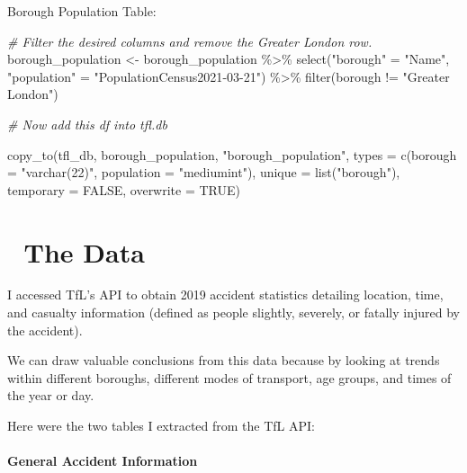 \documentclass[
]{article}
\newenvironment{Shaded}{\begin{snugshade}}{\end{snugshade}}
\newcommand{\AttributeTok}[1]{\textcolor[rgb]{0.77,0.63,0.00}{#1}}
\newcommand{\CommentTok}[1]{\textcolor[rgb]{0.56,0.35,0.01}{\textit{#1}}}
\newcommand{\ConstantTok}[1]{\textcolor[rgb]{0.00,0.00,0.00}{#1}}
\newcommand{\FunctionTok}[1]{\textcolor[rgb]{0.00,0.00,0.00}{#1}}
\newcommand{\NormalTok}[1]{#1}
\newcommand{\OtherTok}[1]{\textcolor[rgb]{0.56,0.35,0.01}{#1}}
\newcommand{\SpecialCharTok}[1]{\textcolor[rgb]{0.00,0.00,0.00}{#1}}
\newcommand{\StringTok}[1]{\textcolor[rgb]{0.31,0.60,0.02}{#1}}
\begin{document}
Borough Population Table:

\begin{Shaded}
\begin{Highlighting}[]
 \CommentTok{\# Filter the desired columns and remove the Greater London row.}
\NormalTok{  borough\_population }\OtherTok{\textless{}{-}}\NormalTok{ borough\_population }\SpecialCharTok{\%\textgreater{}\%}
    \FunctionTok{select}\NormalTok{(}\StringTok{"borough"} \OtherTok{=} \StringTok{"Name"}\NormalTok{, }\StringTok{"population"} \OtherTok{=} \StringTok{"PopulationCensus2021{-}03{-}21"}\NormalTok{) }\SpecialCharTok{\%\textgreater{}\%}
    \FunctionTok{filter}\NormalTok{(borough }\SpecialCharTok{!=} \StringTok{"Greater London"}\NormalTok{)}
  
  \CommentTok{\# Now add this df into tfl.db}
  
  \FunctionTok{copy\_to}\NormalTok{(tfl\_db, borough\_population, }\StringTok{"borough\_population"}\NormalTok{,}
          \AttributeTok{types =} \FunctionTok{c}\NormalTok{(}\AttributeTok{borough =} \StringTok{"varchar(22)"}\NormalTok{,}
                    \AttributeTok{population =} \StringTok{"mediumint"}\NormalTok{),}
          \AttributeTok{unique =} \FunctionTok{list}\NormalTok{(}\StringTok{"borough"}\NormalTok{),}
          \AttributeTok{temporary =} \ConstantTok{FALSE}\NormalTok{, }\AttributeTok{overwrite =} \ConstantTok{TRUE}\NormalTok{)}
\end{Highlighting}
\end{Shaded}

\hypertarget{the-data}{%
\section{💾 The Data}\label{the-data}}

I accessed TfL's API to obtain 2019 accident statistics detailing
location, time, and casualty information (defined as people slightly,
severely, or fatally injured by the accident).

We can draw valuable conclusions from this data because by looking at
trends within different boroughs, different modes of transport, age
groups, and times of the year or day.

Here were the two tables I extracted from the TfL API:

\hypertarget{general-accident-information}{%
\paragraph{General Accident
Information}\label{general-accident-information}}
\end{document}
